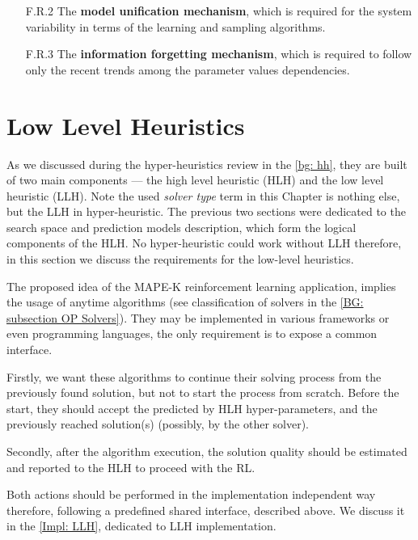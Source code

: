 \begin{itemize}
\begin{enumerate}
		\item[F.R.2] The \textbf{model unification mechanism}, which is required for the system variability in terms of the learning and sampling algorithms.
		
		\item[F.R.3] The \textbf{information forgetting mechanism}, which is required to follow only the recent trends among the parameter values dependencies.
	\end{enumerate}
\end{itemize}

\section{Low Level Heuristics}\label{concept: llh}
As we discussed during the hyper-heuristics review in the \cref{bg: hh}, they are built of two main components — the high level heuristic (HLH) and the low level heuristic (LLH). Note the used \emph{solver type} term in this Chapter is nothing else, but the LLH in hyper-heuristic. The previous two sections were dedicated to the search space and prediction models description, which form the logical components of the HLH. No hyper-heuristic could work without LLH therefore, in this section we discuss the requirements for the low-level heuristics.

The proposed idea of the MAPE-K reinforcement learning application, implies the usage of anytime algorithms (see classification of solvers in the \cref{BG: subsection OP Solvers}).
They may be implemented in various frameworks or even programming languages, the only requirement is to expose a common interface. 

Firstly, we want these algorithms to continue their solving process from the previously found solution, but not to start the process from scratch. Before the start, they should accept the predicted by HLH hyper-parameters, and the previously reached solution(s) (possibly, by the other solver). 

Secondly, after the algorithm execution, the solution quality should be estimated and reported to the HLH to proceed with the RL.

Both actions should be performed in the implementation independent way therefore, following a predefined shared interface, described above. We discuss it in the \cref{Impl: LLH}, dedicated to LLH implementation.


